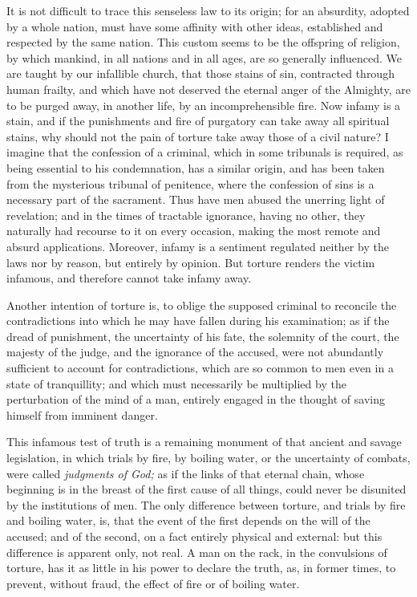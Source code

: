 It is not difficult to trace this senseless law to its origin; for an
absurdity, adopted by a whole nation, must have some affinity with
other ideas, established and respected by the same nation. This custom
seems to be the offspring of religion, by which mankind, in all
nations and in all ages, are so generally influenced. We are taught by
our infallible church, that those stains of sin, contracted through
human frailty, and which have not deserved the eternal anger of the
Almighty, are to be purged away, in another life, by an 
incomprehensible fire. Now infamy is a stain, and if the punishments
and fire of purgatory can take away all spiritual stains, why should
not the pain of torture take away those of a civil nature? I imagine
that the confession of a criminal, which in some tribunals is
required, as being essential to his condemnation, has a similar
origin, and has been taken from the mysterious tribunal of penitence,
where the confession of sins is a necessary part of the sacrament.
Thus have men abused the unerring light of revelation; and in the
times of tractable ignorance, having no other, they naturally had
recourse to it on every occasion, making the most remote and absurd
applications. Moreover, infamy is a sentiment regulated neither by the
laws nor by reason, but entirely by opinion. But torture renders the
victim infamous, and therefore cannot take infamy away.

Another intention of torture is, to oblige the supposed criminal to
reconcile the contradictions into which he may have fallen during his
examination; as if the dread of punishment, the uncertainty of his
fate, the solemnity of the court, the majesty of the judge, and the
ignorance of the accused, were not abundantly sufficient to account
for contradictions, which are so common to men even in a state of
tranquillity; and which must  necessarily be multiplied by
the perturbation of the mind of a man, entirely engaged in the thought
of saving himself from imminent danger.

This infamous test of truth is a remaining monument of that ancient
and savage legislation, in which trials by fire, by boiling water, or
the uncertainty of combats, were called \textit{judgments of God;} as
if the links of that eternal chain, whose beginning is in the breast
of the first cause of all things, could never be disunited by the
institutions of men. The only difference between torture, and trials
by fire and boiling water, is, that the event of the first depends on
the will of the accused; and of the second, on a fact entirely
physical and external: but this difference is apparent only, not real.
A man on the rack, in the convulsions of torture, has it as little in
his power to declare the truth, as, in former times, to prevent,
without fraud, the effect of fire or of boiling water.

